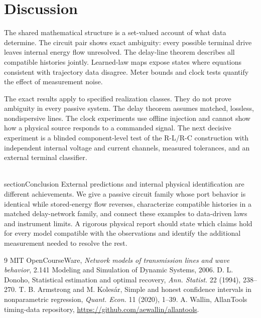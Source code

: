 \documentclass[11pt]{amsart}
\theoremstyle{remark}\newtheorem{remark}[theorem]{Remark}
\begin{document}
\section{Discussion}
The shared mathematical structure is a set-valued account of what data determine. The circuit pair shows exact ambiguity: every possible terminal drive leaves internal energy flow unresolved. The delay-line theorem describes all compatible histories jointly. Learned-law maps expose states where equations consistent with trajectory data disagree. Meter bounds and clock tests quantify the effect of measurement noise.

The exact results apply to specified realization classes. They do not prove ambiguity in every passive system. The delay theorem assumes matched, lossless, nondispersive lines. The clock experiments use offline injection and cannot show how a physical source responds to a commanded signal. The next decisive experiment is a blinded component-level test of the R-L/R-C construction with independent internal voltage and current channels, measured tolerances, and an external terminal classifier.

\\section{Conclusion}
External predictions and internal physical identification are different achievements. We give a passive circuit family whose port behavior is identical while stored-energy flow reverses, characterize compatible histories in a matched delay-network family, and connect these examples to data-driven laws and instrument limits. A rigorous physical report should state which claims hold for every model compatible with the observations and identify the additional measurement needed to resolve the rest.

\begin{thebibliography}{9}
 MIT OpenCourseWare, \emph{Network models of transmission lines and wave behavior}, 2.141 Modeling and Simulation of Dynamic Systems, 2006.
 D. L. Donoho, Statistical estimation and optimal recovery, \emph{Ann. Statist.} 22 (1994), 238--270.
 T. B. Armstrong and M. Koles\'ar, Simple and honest confidence intervals in nonparametric regression, \emph{Quant. Econ.} 11 (2020), 1--39.
 A. Wallin, AllanTools timing-data repository, \url{https://github.com/aewallin/allantools}.
\end{thebibliography}
\end{document}
